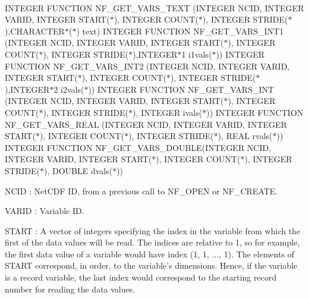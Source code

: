  

I\+N\+T\+E\+G\+ER F\+U\+N\+C\+T\+I\+ON N\+F\+\_\+\+G\+E\+T\+\_\+\+V\+A\+R\+S\+\_\+\+T\+E\+XT (I\+N\+T\+E\+G\+ER N\+C\+ID, I\+N\+T\+E\+G\+ER V\+A\+R\+ID, I\+N\+T\+E\+G\+ER S\+T\+A\+R\+T($\ast$), I\+N\+T\+E\+G\+ER C\+O\+U\+N\+T($\ast$), I\+N\+T\+E\+G\+ER S\+T\+R\+I\+D\+E($\ast$),C\+H\+A\+R\+A\+C\+T\+E\+R$\ast$($\ast$) text) I\+N\+T\+E\+G\+ER F\+U\+N\+C\+T\+I\+ON N\+F\+\_\+\+G\+E\+T\+\_\+\+V\+A\+R\+S\+\_\+\+I\+N\+T1 (I\+N\+T\+E\+G\+ER N\+C\+ID, I\+N\+T\+E\+G\+ER V\+A\+R\+ID, I\+N\+T\+E\+G\+ER S\+T\+A\+R\+T($\ast$), I\+N\+T\+E\+G\+ER C\+O\+U\+N\+T($\ast$), I\+N\+T\+E\+G\+ER S\+T\+R\+I\+D\+E($\ast$),I\+N\+T\+E\+G\+E\+R$\ast$1 i1vals($\ast$)) I\+N\+T\+E\+G\+ER F\+U\+N\+C\+T\+I\+ON N\+F\+\_\+\+G\+E\+T\+\_\+\+V\+A\+R\+S\+\_\+\+I\+N\+T2 (I\+N\+T\+E\+G\+ER N\+C\+ID, I\+N\+T\+E\+G\+ER V\+A\+R\+ID, I\+N\+T\+E\+G\+ER S\+T\+A\+R\+T($\ast$), I\+N\+T\+E\+G\+ER C\+O\+U\+N\+T($\ast$), I\+N\+T\+E\+G\+ER S\+T\+R\+I\+D\+E($\ast$),I\+N\+T\+E\+G\+E\+R$\ast$2 i2vals($\ast$)) I\+N\+T\+E\+G\+ER F\+U\+N\+C\+T\+I\+ON N\+F\+\_\+\+G\+E\+T\+\_\+\+V\+A\+R\+S\+\_\+\+I\+NT (I\+N\+T\+E\+G\+ER N\+C\+ID, I\+N\+T\+E\+G\+ER V\+A\+R\+ID, I\+N\+T\+E\+G\+ER S\+T\+A\+R\+T($\ast$), I\+N\+T\+E\+G\+ER C\+O\+U\+N\+T($\ast$), I\+N\+T\+E\+G\+ER S\+T\+R\+I\+D\+E($\ast$), I\+N\+T\+E\+G\+ER ivals($\ast$)) I\+N\+T\+E\+G\+ER F\+U\+N\+C\+T\+I\+ON N\+F\+\_\+\+G\+E\+T\+\_\+\+V\+A\+R\+S\+\_\+\+R\+E\+AL (I\+N\+T\+E\+G\+ER N\+C\+ID, I\+N\+T\+E\+G\+ER V\+A\+R\+ID, I\+N\+T\+E\+G\+ER S\+T\+A\+R\+T($\ast$), I\+N\+T\+E\+G\+ER C\+O\+U\+N\+T($\ast$), I\+N\+T\+E\+G\+ER S\+T\+R\+I\+D\+E($\ast$), R\+E\+AL rvals($\ast$)) I\+N\+T\+E\+G\+ER F\+U\+N\+C\+T\+I\+ON N\+F\+\_\+\+G\+E\+T\+\_\+\+V\+A\+R\+S\+\_\+\+D\+O\+U\+B\+LE(I\+N\+T\+E\+G\+ER N\+C\+ID, I\+N\+T\+E\+G\+ER V\+A\+R\+ID, I\+N\+T\+E\+G\+ER S\+T\+A\+R\+T($\ast$), I\+N\+T\+E\+G\+ER C\+O\+U\+N\+T($\ast$), I\+N\+T\+E\+G\+ER S\+T\+R\+I\+D\+E($\ast$), D\+O\+U\+B\+LE dvals($\ast$))

{\ttfamily N\+C\+ID} \+: Net\+C\+DF ID, from a previous call to N\+F\+\_\+\+O\+P\+EN or N\+F\+\_\+\+C\+R\+E\+A\+TE.

{\ttfamily V\+A\+R\+ID} \+: Variable ID.

{\ttfamily S\+T\+A\+RT} \+: A vector of integers specifying the index in the variable from which the first of the data values will be read. The indices are relative to 1, so for example, the first data value of a variable would have index (1, 1, ..., 1). The elements of S\+T\+A\+RT correspond, in order, to the variable’s dimensions. Hence, if the variable is a record variable, the last index would correspond to the starting record number for reading the data values.


